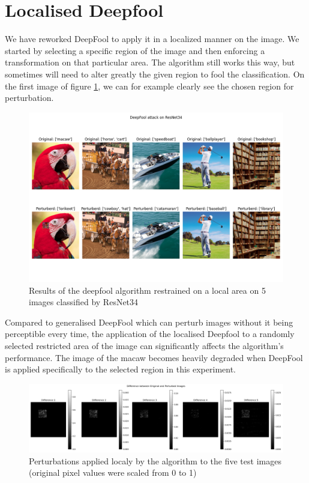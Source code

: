\documentclass{article}
\begin{document}
\newpage
\section{Localised Deepfool}

We have reworked DeepFool to apply it in a localized manner on the image. We started by selecting a specific region of the image and then enforcing a transformation on that particular area. The algorithm still works this way, but sometimes will need to alter greatly the given region to fool the classification. On the first image of figure \ref{fig:vs_50-80}, we can for example clearly see the chosen region for perturbation.

\begin{figure}[H]
    \centering
    \includegraphics[width=1\linewidth]{results/vs_50-80.png}
    \caption{Results of the deepfool algorithm restrained on a local area on 5 images classified by ResNet34}
    \label{fig:vs_50-80}
\end{figure}

Compared to generalised DeepFool which can perturb images without it being perceptible every time, the application of the localised Deepfool to a randomly selected restricted area of the image can significantly affects the algorithm's performance. The image of the macaw becomes heavily degraded when DeepFool is applied specifically to the selected region in this experiment.

\begin{figure}[H]
    \centering
    \includegraphics[width=1\linewidth]{results/Diff_local_grey.png}
    \caption{Perturbations applied localy by the algorithm to the five test images (original pixel values were scaled from 0 to 1)}
    \label{fig:diff_local_grey}
\end{figure}
\end{document}
